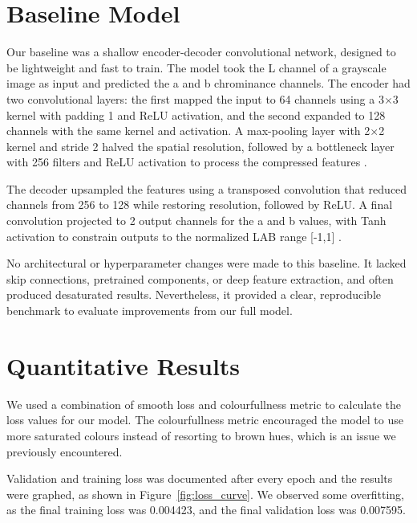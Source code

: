 \documentclass{article} %
\begin{document}
\section{Baseline Model}
\label{baseline}

Our baseline was a shallow encoder-decoder convolutional network, designed to be lightweight and fast to train. The model took the L channel of a grayscale image as input and predicted 
the a and b chrominance channels. The encoder had two convolutional layers: the first mapped the input to 64 channels using a 3$\times$3 kernel with padding 1 and ReLU activation, and the 
second expanded to 128 channels with the same kernel and activation. A max-pooling layer with 2$\times$2 kernel and stride 2 halved the spatial resolution, followed by a bottleneck layer 
with 256 filters and ReLU activation to process the compressed features \citep{leatvanich2025image}.

The decoder upsampled the features using a transposed convolution that reduced channels from 256 to 128 while restoring resolution, followed by ReLU. A final convolution projected to 2 
output channels for the a and b values, with Tanh activation to constrain outputs to the normalized LAB range [-1,1] \citep{rosebrock2019bwcolorization}.

No architectural or hyperparameter changes were made to this baseline. It lacked skip connections, pretrained components, or deep feature extraction, and often produced desaturated results. 
Nevertheless, it provided a clear, reproducible benchmark to evaluate improvements from our full model.

\section{Quantitative Results}
\label{quant_results}

We used a combination of smooth loss and colourfullness metric to calculate the loss values for our model. The colourfullness metric encouraged the model to use more saturated colours
instead of resorting to brown hues, which is an issue we previously encountered. 

Validation and training loss was documented after every epoch and the results were graphed, as shown in Figure~\ref{fig:loss_curve}. We observed some overfitting, as the final 
training loss was 0.004423, and the final validation loss was 0.007595.
\end{document}
